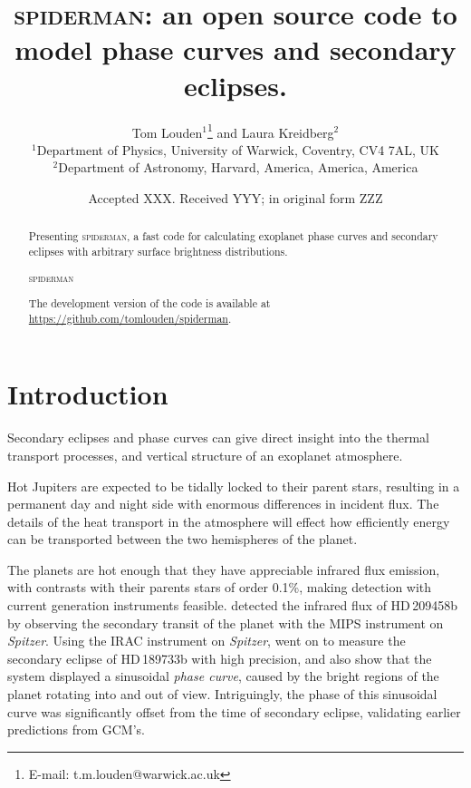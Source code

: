 \documentclass[a4paper,fleqn,usenatbib]{mnras}
\title[spiderman]{\textsc{spiderman}: an open source code to model phase curves and secondary eclipses.}
\author[T. Louden, L. Kreidberg]{Tom Louden$^{1}$\thanks{E-mail: t.m.louden@warwick.ac.uk} and Laura Kreidberg$^{2}$\\
$^{1}$Department of Physics, University of Warwick, Coventry, CV4 7AL, UK\\
$^{2}$Department of Astronomy, Harvard, America, America, America}
\date{Accepted XXX. Received YYY; in original form ZZZ}
\begin{document}
\label{firstpage}
\pagerange{\pageref{firstpage}--\pageref{lastpage}}
\maketitle

\begin{abstract}

Presenting \textsc{spiderman}, a fast code for calculating exoplanet phase curves and secondary eclipses with arbitrary surface brightness distributions.

\textsc{spiderman}

The development version of the code is available at \url{https://github.com/tomlouden/spiderman}.

\end{abstract}

\begin{keywords}
\end{keywords}



\section{Introduction}\label{sec:introduction}

Secondary eclipses and phase curves can give direct insight into the thermal transport processes, and vertical structure of an exoplanet atmosphere.

Hot Jupiters are expected to be tidally locked to their parent stars, resulting in a permanent day and night side with enormous differences in incident flux. The details of the heat transport in the atmosphere will effect how efficiently energy can be transported between the two hemispheres of the planet.

The planets are hot enough that they have appreciable infrared flux emission, with contrasts with their parents stars of order 0.1\%, making detection with current generation instruments feasible. \citet{Deming2005} detected the infrared flux of HD\,209458b by observing the secondary transit of the planet with the MIPS instrument on \emph{Spitzer}. Using the IRAC instrument on \emph{Spitzer}, \citet{Knutson2007b} went on to measure the secondary eclipse of HD\,189733b with high precision, and also show that the system displayed a sinusoidal \emph{phase curve}, caused by the bright regions of the planet rotating into and out of view. Intriguingly, the phase of this sinusoidal curve was significantly offset from the time of secondary eclipse, validating earlier predictions from GCM's.
\end{document}
